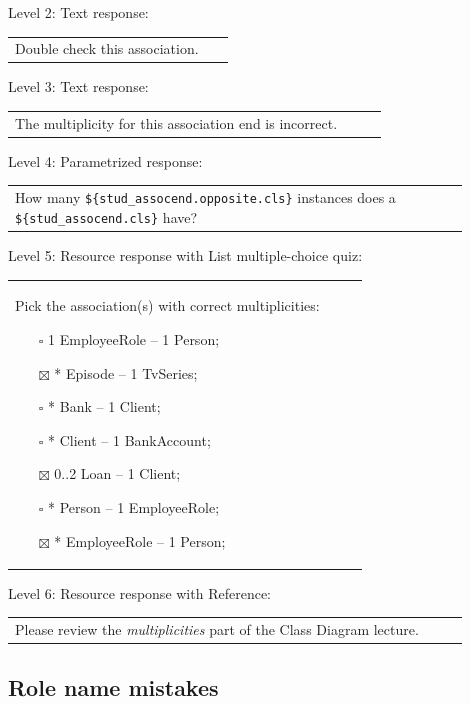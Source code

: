 \noindent Level 2: Text response: \medskip

\begin{tabular}{|p{0.9\linewidth}}
Double check this association.
\end{tabular} \medskip

\noindent Level 3: Text response: \medskip

\begin{tabular}{|p{0.9\linewidth}}
The multiplicity for this association end is incorrect.
\end{tabular} \medskip

\noindent Level 4: Parametrized response: \medskip

\begin{tabular}{|p{0.9\linewidth}}
How many \verb|${stud_assocend.opposite.cls}| instances does a \verb|${stud_assocend.cls}| have?
\end{tabular} \medskip

\noindent Level 5: Resource response with List multiple-choice quiz: \medskip

\begin{tabular}{|p{0.9\linewidth}}

Pick the association(s) with correct multiplicities:

\begin{itemize}
    \item[$\square$] 1 EmployeeRole -- 1 Person;
    \item[$\boxtimes$] * Episode -- 1 TvSeries;
    \item[$\square$] * Bank -- 1 Client;
    \item[$\square$] * Client -- 1 BankAccount;
    \item[$\boxtimes$] 0..2 Loan -- 1 Client;
    \item[$\square$] * Person -- 1 EmployeeRole;
    \item[$\boxtimes$] * EmployeeRole -- 1 Person;
\end{itemize}

\end{tabular} \medskip

\noindent Level 6: Resource response with Reference: \medskip

\begin{tabular}{|p{0.9\linewidth}}
Please review the \textit{multiplicities} part of the Class Diagram lecture.
\end{tabular} \medskip


\subsection{Role name mistakes}

